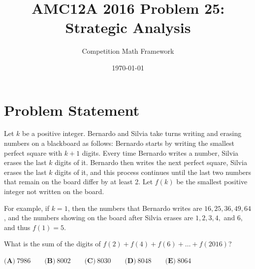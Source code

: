 \documentclass[]{article}
\begin{document}
\title{AMC12A 2016 Problem 25: Strategic Analysis}
\author{Competition Math Framework}
\date{\today}
\maketitle

\section*{Problem Statement}

Let $k$ be a positive integer. Bernardo and Silvia take turns writing and erasing numbers on a blackboard as follows: Bernardo starts by writing the smallest perfect square with $k+1$ digits. Every time Bernardo writes a number, Silvia erases the last $k$ digits of it. Bernardo then writes the next perfect square, Silvia erases the last $k$ digits of it, and this process continues until the last two numbers that remain on the board differ by at least 2. Let $f(k)$ be the smallest positive integer not written on the board. 

For example, if $k = 1$, then the numbers that Bernardo writes are $16, 25, 36, 49, 64$, and the numbers showing on the board after Silvia erases are $1, 2, 3, 4,$ and $6$, and thus $f(1) = 5$. 

What is the sum of the digits of $f(2) + f(4)+ f(6) + \dots + f(2016)$?

$\textbf{(A)}\ 7986\qquad\textbf{(B)}\ 8002\qquad\textbf{(C)}\ 8030\qquad\textbf{(D)}\ 8048\qquad\textbf{(E)}\ 8064$
\end{document}
